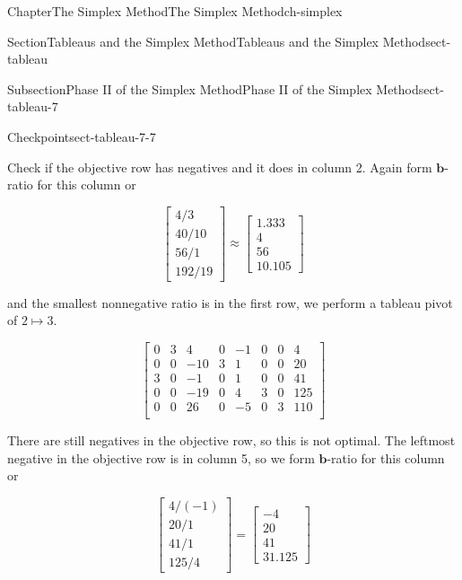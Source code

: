 \documentclass[oneside,10pt,]{book}
\numberwithin{equation}{section}
\newcommand{\amp}{&}
\begin{document}
\begin{chapterptx}{Chapter}{The Simplex Method}{}{The Simplex Method}{}{}{ch-simplex}
\begin{sectionptx}{Section}{Tableaus and the Simplex Method}{}{Tableaus and the Simplex Method}{}{}{sect-tableau}
\begin{subsectionptx}{Subsection}{Phase II of the Simplex Method}{}{Phase II of the Simplex Method}{}{}{sect-tableau-7}
\begin{inlineexercise}{Checkpoint}{}{sect-tableau-7-7}
\begin{equation*}
\end{equation*}
%
\par
Check if the objective row has negatives and it does in column 2. Again form \(\boldsymbol{b}\)-ratio for this column or%
\par
%
\begin{equation*}
\begin{bmatrix} 4/3 \\ 40/10 \\ 56/1 \\ 192/19 \end{bmatrix} \approx \begin{bmatrix} 1.333 \\ 4 \\ 56 \\ 10.105 \end{bmatrix}
\end{equation*}
%
\par
and the smallest nonnegative ratio is in the first row,  we perform a tableau pivot of \(2 \mapsto 3\).%
\par
%
\begin{equation*}
\left[\begin{array}{rr|rrrrr|r} 0 \amp 3 \amp 4 \amp 0 \amp -1 \amp 0 \amp 0 \amp 4\\ 0 \amp 0 \amp -10 \amp 3 \amp 1 \amp 0 \amp 0 \amp 20\\ 3 \amp 0 \amp -1 \amp 0 \amp 1 \amp 0 \amp 0 \amp 41\\ 0 \amp 0 \amp -19 \amp 0 \amp 4 \amp 3 \amp 0 \amp 125\\ \hline 0 \amp 0 \amp 26 \amp 0 \amp -5 \amp 0 \amp 3 \amp 110\\ \end{array} \right]
\end{equation*}
%
\par
There are still negatives in the objective row, so this is not optimal. The leftmost negative in the objective row is in column 5, so we form \(\boldsymbol{b}\)-ratio for this column or%
\par
%
\begin{equation*}
\begin{bmatrix} 4/(-1) \\ 20/1 \\ 41/1 \\ 125/4 \end{bmatrix} = \begin{bmatrix} -4 \\ 20 \\ 41 \\ 31.125 \end{bmatrix}

\end{equation*}
\end{inlineexercise}
\end{subsectionptx}
\end{sectionptx}
\end{chapterptx}
\end{document}
